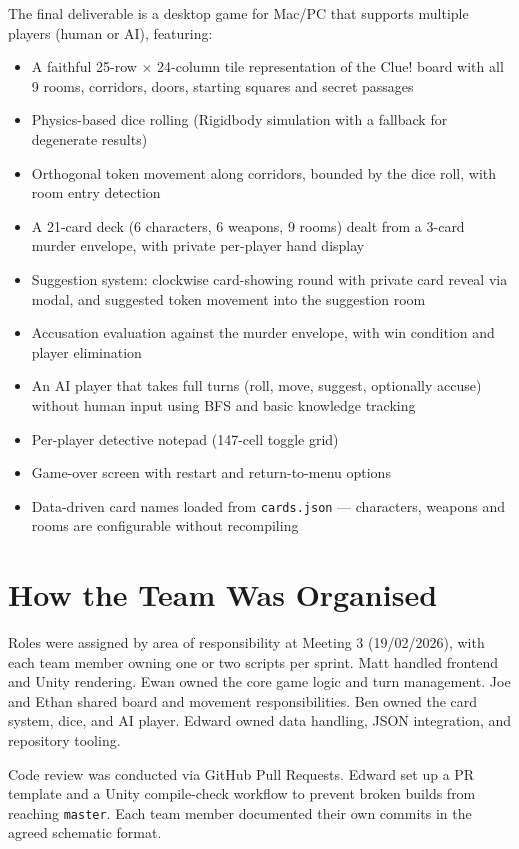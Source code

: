 The final deliverable is a desktop game for Mac/PC that supports multiple players (human or AI), featuring:
\begin{itemize}
    \item A faithful 25-row $\times$ 24-column tile representation of the Clue! board with all 9 rooms, corridors, doors, starting squares and secret passages
    \item Physics-based dice rolling (Rigidbody simulation with a fallback for degenerate results)
    \item Orthogonal token movement along corridors, bounded by the dice roll, with room entry detection
    \item A 21-card deck (6 characters, 6 weapons, 9 rooms) dealt from a 3-card murder envelope, with private per-player hand display
    \item Suggestion system: clockwise card-showing round with private card reveal via modal, and suggested token movement into the suggestion room
    \item Accusation evaluation against the murder envelope, with win condition and player elimination
    \item An AI player that takes full turns (roll, move, suggest, optionally accuse) without human input using BFS and basic knowledge tracking
    \item Per-player detective notepad (147-cell toggle grid)
    \item Game-over screen with restart and return-to-menu options
    \item Data-driven card names loaded from \texttt{cards.json} --- characters, weapons and rooms are configurable without recompiling
\end{itemize}

\section{How the Team Was Organised}

Roles were assigned by area of responsibility at Meeting 3 (19/02/2026), with each team member owning one or two scripts per sprint. Matt handled frontend and Unity rendering. Ewan owned the core game logic and turn management. Joe and Ethan shared board and movement responsibilities. Ben owned the card system, dice, and AI player. Edward owned data handling, JSON integration, and repository tooling.

Code review was conducted via GitHub Pull Requests. Edward set up a PR template and a Unity compile-check workflow to prevent broken builds from reaching \texttt{master}. Each team member documented their own commits in the agreed schematic format.

